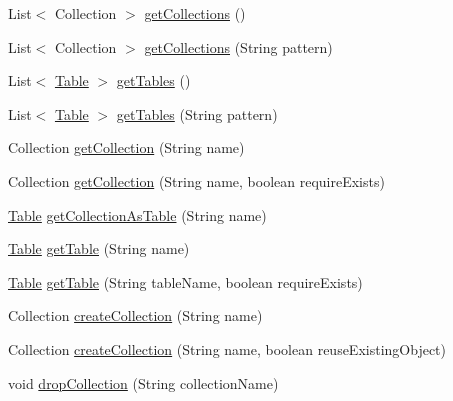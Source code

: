 \begin{DoxyCompactItemize}
\item 
List$<$ Collection $>$ \mbox{\hyperlink{interfacecom_1_1mysql_1_1cj_1_1xdevapi_1_1_schema_a644344cb0eaa8ea239f7b82443c487ec}{get\+Collections}} ()
\item 
List$<$ Collection $>$ \mbox{\hyperlink{interfacecom_1_1mysql_1_1cj_1_1xdevapi_1_1_schema_ac569085a3e372ef1db5f65f3a9e644ce}{get\+Collections}} (String pattern)
\item 
List$<$ \mbox{\hyperlink{interfacecom_1_1mysql_1_1cj_1_1xdevapi_1_1_table}{Table}} $>$ \mbox{\hyperlink{interfacecom_1_1mysql_1_1cj_1_1xdevapi_1_1_schema_a33149bd057a049634d070e97848b8ca1}{get\+Tables}} ()
\item 
List$<$ \mbox{\hyperlink{interfacecom_1_1mysql_1_1cj_1_1xdevapi_1_1_table}{Table}} $>$ \mbox{\hyperlink{interfacecom_1_1mysql_1_1cj_1_1xdevapi_1_1_schema_a8d508f1db090e9724dd20ed9375a9b53}{get\+Tables}} (String pattern)
\item 
Collection \mbox{\hyperlink{interfacecom_1_1mysql_1_1cj_1_1xdevapi_1_1_schema_aeb2f782db94fd4a068b1c1e6b9f3f20e}{get\+Collection}} (String name)
\item 
Collection \mbox{\hyperlink{interfacecom_1_1mysql_1_1cj_1_1xdevapi_1_1_schema_a6c7616f0106d2b05c75ed9e58238f0cf}{get\+Collection}} (String name, boolean require\+Exists)
\item 
\mbox{\hyperlink{interfacecom_1_1mysql_1_1cj_1_1xdevapi_1_1_table}{Table}} \mbox{\hyperlink{interfacecom_1_1mysql_1_1cj_1_1xdevapi_1_1_schema_adaa1920ec971a87acc1173ba0c56f92e}{get\+Collection\+As\+Table}} (String name)
\item 
\mbox{\hyperlink{interfacecom_1_1mysql_1_1cj_1_1xdevapi_1_1_table}{Table}} \mbox{\hyperlink{interfacecom_1_1mysql_1_1cj_1_1xdevapi_1_1_schema_a27cf7ad5981483a0e44b6ea795b3e428}{get\+Table}} (String name)
\item 
\mbox{\hyperlink{interfacecom_1_1mysql_1_1cj_1_1xdevapi_1_1_table}{Table}} \mbox{\hyperlink{interfacecom_1_1mysql_1_1cj_1_1xdevapi_1_1_schema_a555b3596a60f576785190870c67f8ef5}{get\+Table}} (String table\+Name, boolean require\+Exists)
\item 
Collection \mbox{\hyperlink{interfacecom_1_1mysql_1_1cj_1_1xdevapi_1_1_schema_a40a19a9c1a57c92b4197c545d21f11ea}{create\+Collection}} (String name)
\item 
Collection \mbox{\hyperlink{interfacecom_1_1mysql_1_1cj_1_1xdevapi_1_1_schema_a81c42de36893c03f73f130ec5d7080f5}{create\+Collection}} (String name, boolean reuse\+Existing\+Object)
\item 
void \mbox{\hyperlink{interfacecom_1_1mysql_1_1cj_1_1xdevapi_1_1_schema_aed2eef7be93416d42ed6b1d6c86bccdd}{drop\+Collection}} (String collection\+Name)
\end{DoxyCompactItemize}


